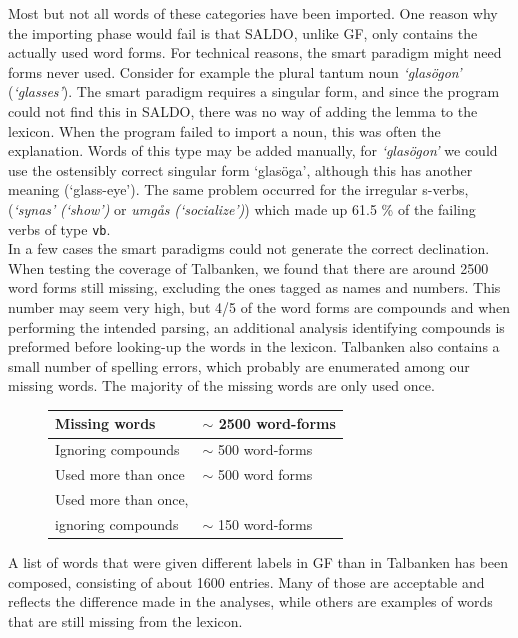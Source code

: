 \documentclass[10pt, a4paper]{article}
\begin{document}
Most but not all words of these categories have been imported.
One reason why the importing phase would fail 
is that SALDO, unlike GF, only contains the actually used word forms.
For technical reasons, the smart paradigm might need forms never used.
Consider for example the plural tantum 
noun \emph{`glas{\"o}gon'} (\emph{`glasses'}).
The smart paradigm requires a singular form, and since the program could not
find this in SALDO, there was no way of adding the lemma to the lexicon. 
When the program failed to import a noun, this was often the explanation.
Words of this type may be added manually, for \emph{`glas{\"o}gon'} we could use
the ostensibly correct singular form `glas{\"o}ga', although this
has another meaning (`glass-eye').
The same problem occurred for the irregular s-verbs,
(\emph{`synas'} \emph{(`show')} or \emph{umg{\aa}s} \emph{(`socialize')})
which made up 61.5 \% of the failing verbs of type \verb_vb_.\\
In a few cases the smart paradigms could not generate the correct declination.\\
When testing the coverage of Talbanken,
we found that there are around 2500 word forms still missing, excluding the ones
tagged as names and numbers. This number may seem very high, but 
4/5 of the word forms are compounds and when performing the intended parsing,
an additional analysis identifying compounds is preformed before
looking-up the words in the lexicon. 
Talbanken also contains a small number of 
spelling errors, which probably are enumerated among our missing words. The majority
of the missing words are only used once.\\
\begin{figure}[h]
\begin{tabular}{|l|l|}
\hline
Missing words &$\sim$ 2500 word-forms\\
\hline
\hline
Ignoring compounds & $\sim$ 500 word-forms\\
Used more than once & $\sim$ 500 word forms\\
Used more than once,& \\
\hspace{2mm} ignoring compounds & $\sim$ 150 word-forms\\
\hline
\end{tabular}
\caption{}
\end{figure}
A list of words that were given different labels in GF than in Talbanken has been
composed, consisting of about 1600 entries. Many of those are
acceptable and reflects the difference 
made in the analyses, while
others are examples of words that are still missing from
the lexicon.
\end{document}
